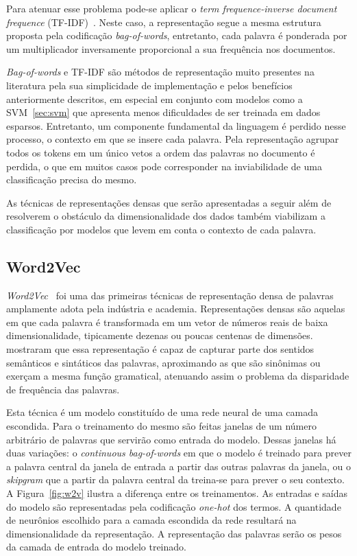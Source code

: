 Para atenuar esse problema pode-se aplicar o \textit{term frequence-inverse
document frequence} (TF-IDF)~\cite{salton88}.
Neste caso, a representação segue a mesma estrutura proposta pela codificação
\textit{bag-of-words}, entretanto, cada palavra é ponderada por um multiplicador
inversamente proporcional a sua frequência nos documentos.


\textit{Bag-of-words} e TF-IDF são métodos de representação muito presentes na
literatura pela sua simplicidade de implementação e pelos benefícios
anteriormente descritos, em especial em conjunto com modelos como a
SVM~\ref{sec:svm} que apresenta menos dificuldades de ser treinada em dados
esparsos.
Entretanto, um componente fundamental da linguagem é perdido nesse processo, o
contexto em que se insere cada palavra.
Pela representação agrupar todos os tokens em um único vetos a ordem das
palavras no documento é perdida, o que em muitos casos pode corresponder na
inviabilidade de uma classificação precisa do mesmo.


As técnicas de representações densas que serão apresentadas a seguir além de
resolverem o obstáculo da dimensionalidade dos dados também viabilizam a
classificação por modelos que levem em conta o contexto de cada palavra.

\subsection{Word2Vec} \label{sec:w2v}

\textit{Word2Vec}~\cite{mikolov13} foi uma das primeiras técnicas de
representação densa de palavras amplamente adota pela indústria e academia.
Representações densas são aquelas em que cada palavra é transformada em um vetor
de números reais de baixa dimensionalidade, tipicamente dezenas ou poucas
centenas de dimensões.
\citet{mikolov13} mostraram que essa representação é capaz de capturar parte dos
sentidos semânticos e sintáticos das palavras, aproximando as que são sinônimas
ou exerçam a mesma função gramatical, atenuando assim o problema da disparidade
de frequência das palavras.

Esta técnica é um modelo constituído de uma rede neural de uma camada escondida.
Para o treinamento do mesmo são feitas janelas de um número arbitrário de
palavras que servirão como entrada do modelo.
Dessas janelas há duas variações: o \textit{continuous bag-of-words} em que
o modelo é treinado para prever a palavra central da janela de entrada a partir
das outras palavras da janela, ou o \textit{skipgram} que a partir da palavra
central da treina-se para prever o seu contexto.
A Figura~\ref{fig:w2v} ilustra a diferença entre os treinamentos.
As entradas e saídas do modelo são representadas pela codificação
\textit{one-hot} dos termos.
A quantidade de neurônios escolhido para a camada escondida da rede resultará na
dimensionalidade da representação.
A representação das palavras serão os pesos da camada de entrada do modelo
treinado.

